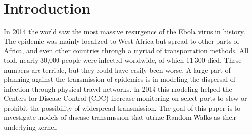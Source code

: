 \section{Introduction}\label{sec:introduction-\myInitials}


In 2014 the world saw the most massive resurgence of the Ebola virus in history. The epidemic was mainly localized to West Africa but spread to other parts of Africa, and even other countries through a myriad of transportation methods. All told, nearly 30,000 people were infected worldwide, of which 11,300 died. These numbers are terrible, but they could have easily been worse. A large part of planning against the transmission of epidemics is in modeling the dispersal of infection through physical travel networks. In 2014 this modeling helped the Centers for Disease Control (CDC) increase monitoring on select ports to slow or prohibit the possibility of widespread transmission. The goal of this paper is to investigate models of disease transmission that utilize Random Walks as their underlying kernel. 